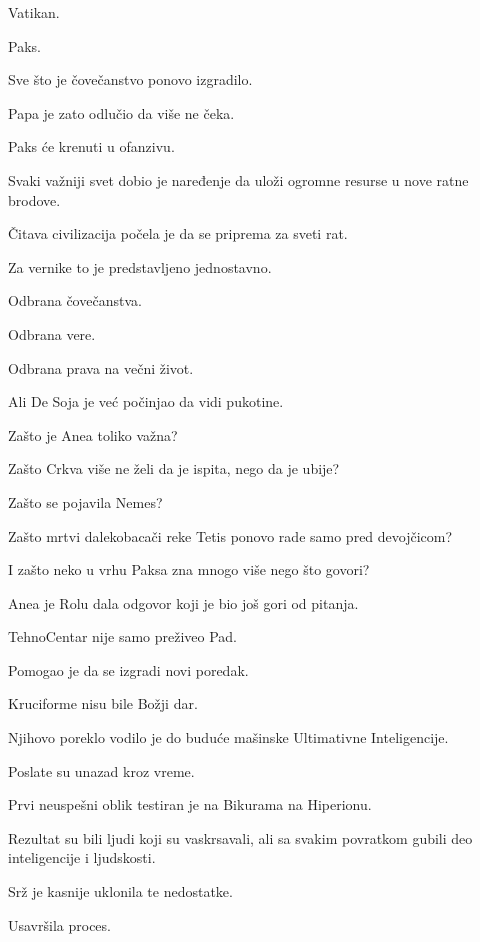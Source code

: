 Vatikan.

Paks.

Sve što je čovečanstvo ponovo izgradilo.

\bigskip

Papa je zato odlučio da više ne čeka.

Paks će krenuti u ofanzivu.

\bigskip

Svaki važniji svet dobio je naređenje da uloži ogromne resurse u nove ratne brodove.

Čitava civilizacija počela je da se priprema za sveti rat.

\bigskip

Za vernike to je predstavljeno jednostavno.

Odbrana čovečanstva.

Odbrana vere.

Odbrana prava na večni život.

\bigskip

Ali De Soja je već počinjao da vidi pukotine.

\bigskip

Zašto je Anea toliko važna?

Zašto Crkva više ne želi da je ispita, nego da je ubije?

Zašto se pojavila Nemes?

Zašto mrtvi dalekobacači reke Tetis ponovo rade samo pred devojčicom?

I zašto neko u vrhu Paksa zna mnogo više nego što govori?

\bigskip

Anea je Rolu dala odgovor koji je bio još gori od pitanja.

TehnoCentar nije samo preživeo Pad.

Pomogao je da se izgradi novi poredak.

\bigskip

Kruciforme nisu bile Božji dar.

Njihovo poreklo vodilo je do buduće mašinske Ultimativne Inteligencije.

Poslate su unazad kroz vreme.

Prvi neuspešni oblik testiran je na Bikurama na Hiperionu.

Rezultat su bili ljudi koji su vaskrsavali, ali sa svakim povratkom gubili deo inteligencije i ljudskosti.

\bigskip

Srž je kasnije uklonila te nedostatke.

Usavršila proces.

